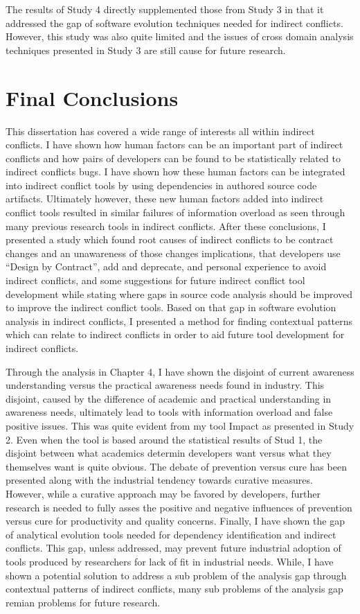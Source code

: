 The results of Study 4 directly supplemented those from Study 3 in that it addressed the gap of software evolution techniques
needed for indirect conflicts. However, this study was also quite limited and the issues of cross domain analysis techniques
presented in Study 3 are still cause for future research.

\section{Final Conclusions}

This dissertation has covered a wide range of interests all within indirect conflicts. I have shown how human factors can
be an important part of indirect conflicts and how pairs of developers can be found to be statistically related to indirect
conflicts bugs. I have shown how these human factors can be integrated into indirect conflict tools by using dependencies in 
authored source code artifacts. Ultimately however, these new human factors added into indirect conflict tools resulted in
similar failures of information overload as seen through many previous research tools in indirect conflicts. After these conclusions,
I presented a study which found root causes of indirect conflicts to be contract changes and an unawareness of those changes
implications, that developers use ``Design by Contract'', add and deprecate, and personal experience to avoid indirect conflicts,
and some suggestions for future indirect conflict tool development while stating where gaps in source code analysis should
be improved to improve the indirect conflict tools. Based on that gap in
software evolution analysis in indirect conflicts, I presented a method for finding contextual patterns which can relate to
indirect conflicts in order to aid future tool development for indirect conflicts.


Through the analysis in Chapter 4, I have shown the disjoint of current awareness understanding versus the practical
awareness needs found in industry. This disjoint, caused by the difference of academic and practical understanding in awareness needs,
ultimately lead to tools with information overload and false positive issues. This was quite evident from my tool Impact as
presented in Study 2. Even when the tool is based around the statistical results of Stud 1, the disjoint between what academics
determin developers want versus what they themselves want is quite obvious. The debate of prevention versus cure has been presented along with
the industrial tendency towards curative measures. However, while a curative approach may be favored by developers, further research is needed
to fully asses the positive and negative influences of prevention versus cure for productivity and quality concerns. Finally, I have shown
the gap of analytical evolution tools needed for dependency identification and indirect conflicts. This gap, unless addressed, may prevent
future industrial adoption of tools produced by researchers for lack of fit in industrial needs. While, I have shown a potential solution to address
a sub problem of the analysis gap through contextual patterns of indirect conflicts, many sub problems of the analysis gap remian problems
for future research.
